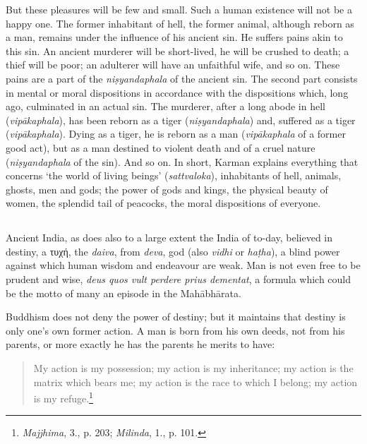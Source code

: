 \documentclass[a4paper, 11pt, oneside, english]{article}
\begin{document}
But these pleasures will be few and small. Such a human existence will not be a happy one. The former inhabitant of hell, the former animal, although reborn as a man, remains under the influence of his ancient sin. He suffers pains akin to this sin. An ancient murderer will be short-lived, he will be crushed to death; a thief will be poor; an adulterer will have an unfaithful wife, and so on. These pains are a part of the \emph{niṣyandaphala} of the ancient sin. The second part consists in mental or moral dispositions in accordance with the dispositions which, long ago, culminated in an actual sin. The murderer, after a long abode in hell (\emph{vipākaphala}), has been reborn as a tiger (\emph{niṣyandaphala}) and, suffered as a tiger (\emph{vipākaphala}). Dying as a tiger, he is reborn as a man (\emph{vipākaphala} of a former good act), but as a man destined to violent death and of a cruel nature (\emph{niṣyandaphala} of the sin). And so on. In short, Karman explains everything that concerns `the world of living beings' (\emph{sattvaloka}), inhabitants of hell, animals, ghosts, men and gods; the power of gods and kings, the physical beauty of women, the splendid tail of peacocks, the moral dispositions of everyone.

\subsection{}
\paragraph{}
Ancient India, as does also to a large extent the India of to-day, believed in destiny, a τυχή, the \emph{daiva}, from \emph{deva}, god (also \emph{vidhi} or \emph{haṭha}), a blind power against which human wisdom and endeavour are weak. Man is not even free to be prudent and wise, \emph{deus quos vult perdere prius dementat}, a formula which could be the motto of many an episode in the Mahābhārata.

Buddhism does not deny the power of destiny; but it maintains that destiny is only one's own former action. A man is born from his own deeds, not from his parents, or more exactly he has the parents he merits to have:
\begin{quotation}
\small
My action is my possession; my action is my inheritance; my action is the matrix which bears me; my action is the race to which I belong; my action is my refuge.\footnote{\emph{Majjhima}, 3., p. 203; \emph{Milinda}, 1., p. 101.}
\end{quotation}
\end{document}
